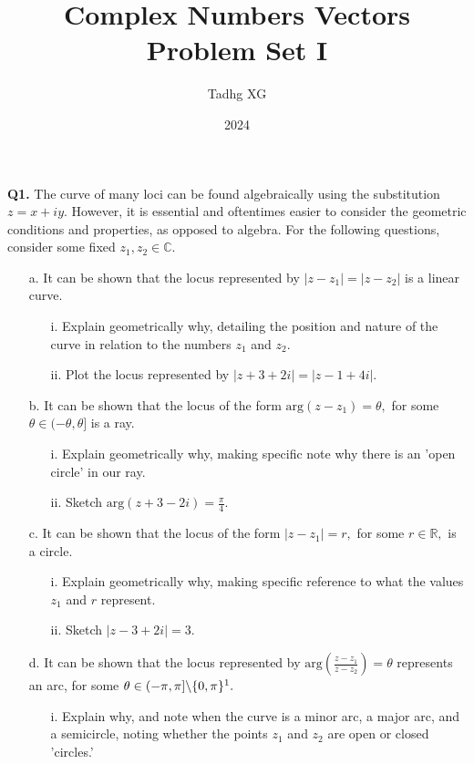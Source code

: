 \documentclass{article}
\title{Complex Numbers Vectors Problem Set I}
\author{Tadhg XG}
\date{2024}
\begin{document}
\maketitle

\textbf{Q1.} The curve of many loci can be found algebraically using the substitution $z=x+iy.$ However, it is essential and oftentimes easier to consider the geometric conditions and properties, as opposed to algebra. For the following questions, consider some fixed $z_1,z_2\in \mathbb{C}.$
\begin{enumerate}
    \item[a.] It can be shown that the locus represented by $|z-z_1| = |z-z_2|$ is a linear 
    curve. 
    \begin{enumerate}
        \item[i.] Explain geometrically why, detailing the position and nature of the curve in relation to the numbers $z_1$ and $z_2.$
        \item[ii.] Plot the locus represented by $|z+3+2i|=|z-1+4i|.$
    \end{enumerate}
    \item[b.] It can be shown that the locus of the form $\text{arg}(z-z_1)=\theta,$ for some $\theta \in (-\theta, \theta]$ is a ray.
    \begin{enumerate}
        \item[i.] Explain geometrically why, making specific note why there is an 'open circle' in our ray.
        \item[ii.] Sketch $\text{arg}(z+3-2i)=\frac{\pi}{4}.$
    \end{enumerate}
    \item[c.] It can be shown that the locus of the form $|z-z_1|=r,$ for some $r\in\mathbb{R},$ is a circle.
    \begin{enumerate}
        \item[i.] Explain geometrically why, making specific reference to what the values $z_1$ and $r$ represent.
        \item[ii.] Sketch $|z-3+2i|=3.$
    \end{enumerate}
    \item[d.] It can be shown that the locus represented by $\text{arg}(\frac{z-z_1}{z-z_2})=\theta$ represents an arc, for some $\theta \in (-\pi, \pi] \backslash \{0, \pi \} \footnote{Scary notation!!! This is just any principal argument for $\theta$, not including 0 and $\pi$ (why?).}.$
    \begin{enumerate}
        \item[i.] Explain why, and note when the curve is a minor arc, a major arc, and a semicircle, noting whether the points $z_1$ and $z_2$ are open or closed 'circles.'

\end{enumerate}
\end{enumerate}
\end{document}
